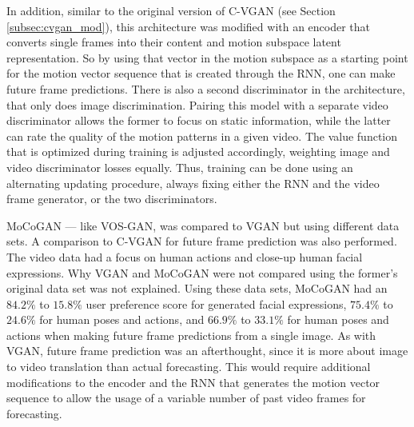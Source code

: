 \pagebreak

In addition, similar to the original version of C-VGAN (see Section \ref{subsec:cvgan_mod}), this architecture was modified with an encoder that converts single frames into their content and motion subspace latent representation. So by using that vector in the motion subspace as a starting point for the motion vector sequence that is created through the RNN, one can make future frame predictions. There is also a second discriminator in the architecture, that only does image discrimination. Pairing this model with a separate video discriminator allows the former to focus on static information, while the latter can rate the quality of the motion patterns in a given video. The value function that is optimized during training is adjusted accordingly, weighting image and video discriminator losses equally. Thus, training can be done using an alternating updating procedure, always fixing either the RNN and the video frame generator, or the two discriminators.

\pagebreak

MoCoGAN --- like VOS-GAN, was compared to VGAN but using different data sets. A comparison to C-VGAN for future frame prediction was also performed. The video data had a focus on human actions and close-up human facial expressions. Why VGAN and MoCoGAN were not compared using the former's original data set was not explained. Using these data sets, MoCoGAN had an $84.2\%$ to $15.8\%$ user preference score for generated facial expressions, $75.4\%$ to $24.6\%$ for human poses and actions, and $66.9\%$ to $33.1\%$ for human poses and actions when making future frame predictions from a single image. As with VGAN, future frame prediction was an afterthought, since it is more about image to video translation than actual forecasting. This would require additional modifications to the encoder and the RNN that generates the motion vector sequence to allow the usage of a variable number of past video frames for forecasting.

